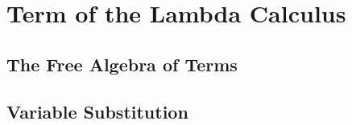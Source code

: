 \section{Term of the Lambda Calculus}
    \subsection{The Free Algebra of Terms}
        
    \subsection{Variable Substitution}
        

